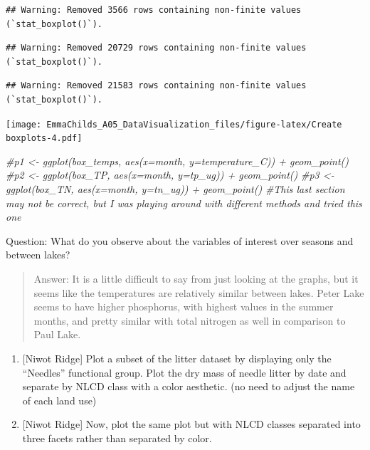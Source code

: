\documentclass[
]{article}
\newenvironment{Shaded}{\begin{snugshade}}{\end{snugshade}}
\newcommand{\CommentTok}[1]{\textcolor[rgb]{0.56,0.35,0.01}{\textit{#1}}}
\begin{document}
\begin{verbatim}
## Warning: Removed 3566 rows containing non-finite values (`stat_boxplot()`).
\end{verbatim}

\begin{verbatim}
## Warning: Removed 20729 rows containing non-finite values (`stat_boxplot()`).
\end{verbatim}

\begin{verbatim}
## Warning: Removed 21583 rows containing non-finite values (`stat_boxplot()`).
\end{verbatim}

\texttt{[image: EmmaChilds\_A05\_DataVisualization\_files/figure-latex/Create boxplots-4.pdf]}

\begin{Shaded}
\begin{Highlighting}[]
\CommentTok{\#p1 \textless{}{-} ggplot(box\_temps, aes(x=month, y=temperature\_C)) + geom\_point()}
\CommentTok{\#p2 \textless{}{-} ggplot(box\_TP, aes(x=month, y=tp\_ug)) + geom\_point()}
\CommentTok{\#p3 \textless{}{-} ggplot(box\_TN, aes(x=month, y=tn\_ug)) + geom\_point()}
\CommentTok{\#This last section may not be correct, but I was playing around with different methods and tried this one}
\end{Highlighting}
\end{Shaded}

Question: What do you observe about the variables of interest over
seasons and between lakes?

\begin{quote}
Answer: It is a little difficult to say from just looking at the graphs,
but it seems like the temperatures are relatively similar between lakes.
Peter Lake seems to have higher phosphorus, with highest values in the
summer months, and pretty similar with total nitrogen as well in
comparison to Paul Lake.
\end{quote}

\begin{enumerate}
\def\labelenumi{\arabic{enumi}.}
\setcounter{enumi}{5}
\item
  {[}Niwot Ridge{]} Plot a subset of the litter dataset by displaying
  only the ``Needles'' functional group. Plot the dry mass of needle
  litter by date and separate by NLCD class with a color aesthetic. (no
  need to adjust the name of each land use)
\item
  {[}Niwot Ridge{]} Now, plot the same plot but with NLCD classes
  separated into three facets rather than separated by color.
\end{enumerate}
\end{document}
